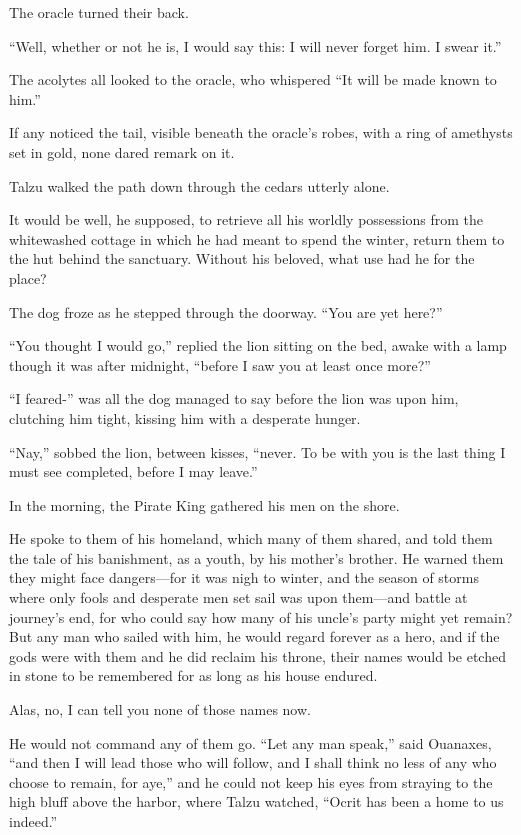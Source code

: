 The oracle turned their back.

``Well, whether or not he is, I would say this: I will never forget him. I swear it.''

The acolytes all looked to the oracle, who whispered ``It will be made known to him.''

If any noticed the tail, visible beneath the oracle's robes, with a ring of amethysts set in gold, none dared remark on it.

\secdiv

\noindent Talzu walked the path down through the cedars utterly alone.

It would be well, he supposed, to retrieve all his worldly possessions from the whitewashed cottage in which he had meant to spend the winter, return them to the hut behind the sanctuary. Without his beloved, what use had he for the place?

The dog froze as he stepped through the doorway. ``You are yet here?''

``You thought I would go,'' replied the lion sitting on the bed, awake with a lamp though it was after midnight, ``before I saw you at least once more?''

``I feared-'' was all the dog managed to say before the lion was upon him, clutching him tight, kissing him with a desperate hunger.

``Nay,'' sobbed the lion, between kisses, ``never. To be with you is the last thing I must see completed, before I may leave.''

\secdiv

\noindent In the morning, the Pirate King gathered his men on the shore.

He spoke to them of his homeland, which many of them shared, and told them the tale of his banishment, as a youth, by his mother's brother. He warned them they might face dangers---for it was nigh to winter, and the season of storms where only fools and desperate men set sail was upon them---and battle at journey's end, for who could say how many of his uncle's party might yet remain? But any man who sailed with him, he would regard forever as a hero, and if the gods were with them and he did reclaim his throne, their names would be etched in stone to be remembered for as long as his house endured.

Alas, no, I can tell you none of those names now.

He would not command any of them go. ``Let any man speak,'' said Ouanaxes, ``and then I will lead those who will follow, and I shall think no less of any who choose to remain, for aye,'' and he could not keep his eyes from straying to the high bluff above the harbor, where Talzu watched, ``Ocrit has been a home to us indeed.''

